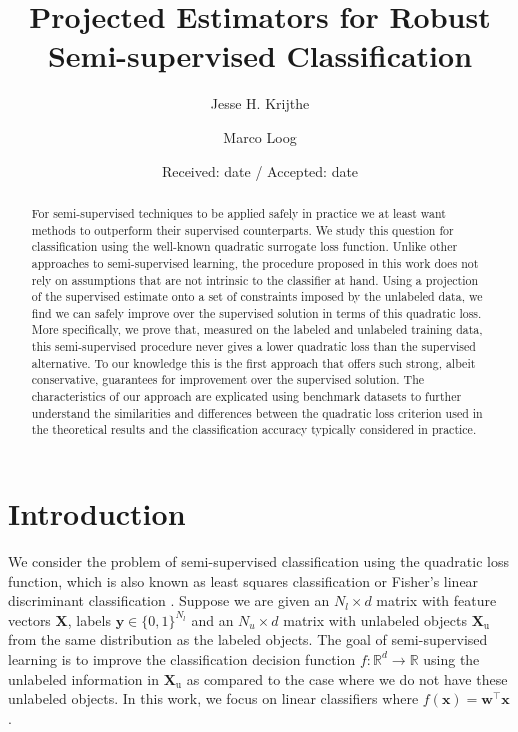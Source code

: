 \documentclass[smallcondensed]{svjour3}\usepackage[]{graphicx}\usepackage[]{color}
\renewcommand{\vec}[1]{\mathbf{#1}}
\begin{document}
\title{Projected Estimators for Robust Semi-supervised Classification}
\author{Jesse H. Krijthe \and Marco Loog}


\date{Received: date / Accepted: date}

\maketitle

\begin{abstract}
For semi-supervised techniques to be applied safely in practice we at least want methods to outperform their supervised counterparts. We study this question for classification using the well-known quadratic surrogate loss function. Unlike other approaches to semi-supervised learning, the procedure proposed in this work does not rely on assumptions that are not intrinsic to the classifier at hand. Using a projection of the supervised estimate onto a set of constraints imposed by the unlabeled data, we find we can safely improve over the supervised solution in terms of this quadratic loss. More specifically, we prove that, measured on the labeled and unlabeled training data, this semi-supervised procedure never gives a lower quadratic loss than the supervised alternative. To our knowledge this is the first approach that offers such strong, albeit conservative, guarantees for improvement over the supervised solution. The characteristics of our approach are explicated using benchmark datasets to further understand the similarities and differences between the quadratic loss criterion used in the theoretical results and the classification accuracy typically considered in practice.
\end{abstract}

\section{Introduction}
\label{Introduction}
We consider the problem of semi-supervised classification using the quadratic loss function, which is also known as least squares classification or Fisher's linear discriminant classification \citep{Hastie2009,Poggio2003}. Suppose we are given an $N_l \times d$ matrix with feature vectors $\vec{X}$, labels $\vec{y} \in \{0,1\}^{N_l}$ and an $N_u \times d$  matrix with unlabeled objects $\vec{X}_\text{u}$ from the same distribution as the labeled objects. The goal of semi-supervised learning is to improve the classification decision function $f: \mathbb{R}^d \to \mathbb{R}$ using the unlabeled information in $\vec{X}_\text{u}$ as compared to the case where we do not have these unlabeled objects. In this work, we focus on linear classifiers where $f(\vec{x})=\vec{w}^\top \vec{x}$. 
\end{document}
